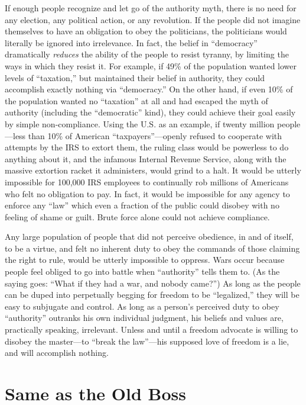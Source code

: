 \documentclass{book}
\begin{document}
If enough people recognize and let go of the authority myth, there is no need for any election, any political action, or any revolution. If the people did not imagine themselves to have an obligation to obey the politicians, the politicians would literally be ignored into irrelevance. In fact, the belief in \enquote{democracy} dramatically \emph{reduces} the ability of the people to resist tyranny, by limiting the ways in which they resist it. For example, if 49\% of the population wanted lower levels of \enquote{taxation,} but maintained their belief in authority, they could accomplish exactly nothing via \enquote{democracy.} On the other hand, if even 10\% of the population wanted no \enquote{taxation} at all and had escaped the myth of authority (including the \enquote{democratic} kind), they could achieve their goal easily by simple non-compliance. Using the U.S. as an example, if twenty million people---less than 10\% of American \enquote{taxpayers}---openly refused to cooperate with attempts by the IRS to extort them, the ruling class would be powerless to do anything about it, and the infamous Internal Revenue Service, along with the massive extortion racket it administers, would grind to a halt. It would be utterly impossible for 100,000 IRS employees to continually rob millions of Americans who felt no obligation to pay. In fact, it would be impossible for any agency to enforce any \enquote{law} which even a fraction of the public could disobey with no feeling of shame or guilt. Brute force alone could not achieve compliance.

Any large population of people that did not perceive obedience, in and of itself, to be a virtue, and felt no inherent duty to obey the commands of those claiming the right to rule, would be utterly impossible to oppress. Wars occur because people feel obliged to go into battle when \enquote{authority} tells them to. (As the saying goes: \enquote{What if they had a war, and nobody came?}) As long as the people can be duped into perpetually begging for freedom to be \enquote{legalized,} they will be easy to subjugate and control. As long as a person's perceived duty to obey \enquote{authority} outranks his own individual judgment, his beliefs and values are, practically speaking, irrelevant. Unless and until a freedom advocate is willing to disobey the master---to \enquote{break the law}---his supposed love of freedom is a lie, and will accomplish nothing.

\section{Same as the Old Boss}
\end{document}
